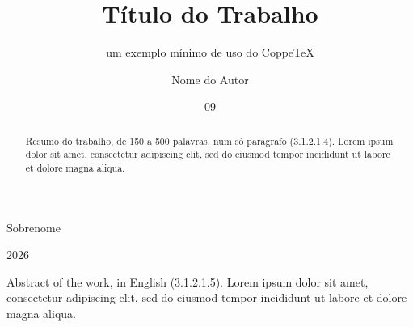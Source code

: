 \documentclass[dsc,pdfa]{ufrj}
\begin{document}
  \title{Título do Trabalho}
  \subtitle{um exemplo mínimo de uso do CoppeTeX}
  \author{Nome do Autor}{Sobrenome}
  \date{09}{2026}



  \maketitle

  \frontmatter

  \begin{abstract}
  Resumo do trabalho, de 150 a 500 palavras, num só parágrafo (3.1.2.1.4).
  Lorem ipsum dolor sit amet, consectetur adipiscing elit, sed do eiusmod
  tempor incididunt ut labore et dolore magna aliqua.
  \end{abstract}

  \begin{foreignabstract}
  Abstract of the work, in English (3.1.2.1.5). Lorem ipsum dolor sit amet,
  consectetur adipiscing elit, sed do eiusmod tempor incididunt ut labore et
  dolore magna aliqua.
  \end{foreignabstract}

  \tableofcontents
\end{document}
